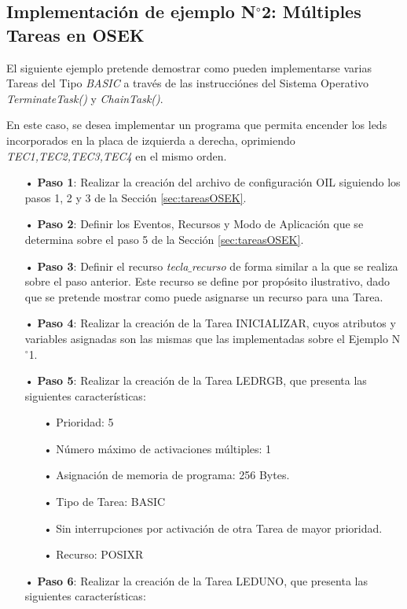 \documentclass[12pt,letterpaper]{article}
\begin{document}
\subsection{Implementación de ejemplo N$^{\circ}$2: Múltiples Tareas en OSEK}

El siguiente ejemplo pretende demostrar como pueden implementarse varias Tareas del Tipo \textit{BASIC} a través de las instrucciónes del Sistema Operativo \textit{TerminateTask()} y \textit{ChainTask()}.

En este caso, se desea implementar un programa que  permita encender los leds incorporados en la placa de izquierda a derecha, oprimiendo \textit{TEC1,TEC2,TEC3,TEC4} en el mismo orden.
\begin{enumerate}
\item[•]\textbf{Paso 1}: Realizar la creación del archivo de configuración OIL siguiendo los pasos 1, 2 y 3 de la Sección \ref{sec:tareasOSEK}.
\item[•]\textbf{Paso 2}: Definir los Eventos, Recursos y Modo de Aplicación que se determina sobre el paso 5 de la Sección \ref{sec:tareasOSEK}.
\item[•]\textbf{Paso 3}: Definir el recurso \textit{tecla$\_$recurso} de forma similar a la que se realiza sobre el paso anterior. Este recurso se define por propósito ilustrativo, dado que se pretende mostrar como puede asignarse un recurso para una Tarea.
\item[•]\textbf{Paso 4}: Realizar la creación de la Tarea INICIALIZAR, cuyos atributos y variables asignadas son las mismas que las implementadas sobre el Ejemplo N$^{\circ}$1.
\item[•]\textbf{Paso 5}: Realizar la creación de la Tarea LEDRGB, que presenta las siguientes características:
\begin{enumerate}
\item[•]Prioridad: 5
\item[•]Número máximo de activaciones múltiples: 1
\item[•]Asignación de memoria de programa: 256 Bytes.
\item[•]Tipo de Tarea: BASIC
\item[•]Sin interrupciones por activación de otra Tarea de mayor prioridad.
\item[•]Recurso: POSIXR
\end{enumerate}
\item[•]\textbf{Paso 6}: Realizar la creación de la Tarea LEDUNO, que presenta las siguientes características:
\begin{enumerate}

\end{enumerate}
\end{enumerate}
\end{document}
